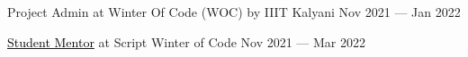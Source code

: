 Project Admin at Winter Of Code (WOC) by IIIT Kalyani \hfill Nov 2021 --- Jan 2022

\href{https://media-exp2.licdn.com/dms/image/C4D2DAQEA_6LRDAI8eg/profile-treasury-document-images_800/1/1648468599618?e=1657756800&v=beta&t=hL2_ffWTPAjbkLPQvlRSlOXnvwtfpUXJf3YrcgO-8Ao}{\textcolor{black}{Student Mentor}} at Script Winter of Code \hfill   Nov 2021 --- Mar 2022

